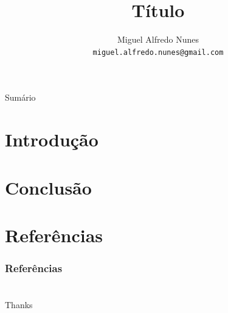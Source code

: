 \documentclass[hyperref={hidelinks}]{beamer}
\title{Título}
\author{Miguel Alfredo Nunes \\ \small{\texttt{miguel.alfredo.nunes@gmail.com}}}
\date{}
\begin{document}
    \begin{frame}
        \titlepage
    \end{frame}

    \begin{frame}{Sumário}
        \tableofcontents
    \end{frame}

    \section{Introdução}
    \label{sec:introducao}
        
        \SecT
        

    \section{Conclusão}
        \label{sec:conclusao}

        \SecT

        

    \section{Referências}
        \label{sec:referencias}

        \SecT

        \begin{frame}[allowframebreaks]
            \frametitle{Referências}

            
            
        \end{frame}

    \section*{}
    \begin{frame}{}

        \begin{center}
            {\Huge Thanks}
            
            \vspace{\baselineskip}

            \vspace{\baselineskip}
            
            \insertauthor
        \end{center}
        
    \end{frame}
\end{document}
